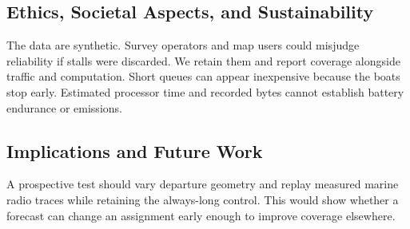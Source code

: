 \subsection{Ethics, Societal Aspects, and Sustainability}
The data are synthetic. Survey operators and map users could misjudge reliability if stalls were discarded. We retain them and report coverage alongside traffic and computation. Short queues can appear inexpensive because the boats stop early. Estimated processor time and recorded bytes cannot establish battery endurance or emissions.

\subsection{Implications and Future Work}
A prospective test should vary departure geometry and replay measured marine radio traces while retaining the always-long control. This would show whether a forecast can change an assignment early enough to improve coverage elsewhere.
